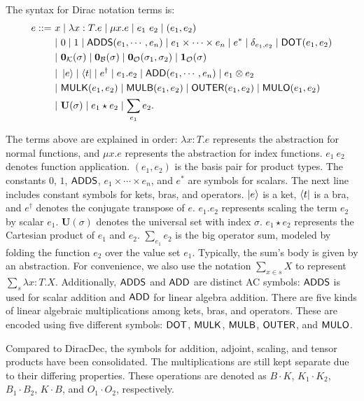 \begin{definition}
    The syntax for Dirac notation terms is:
    \begin{align*}
        e ::=\ & x \mid \lambda x : T.e \mid \mu x.e \mid e_1\ e_2 \mid (e_1, e_2) \\
        & |\ 0 \mid 1 \mid \mathsf{ADDS}(e_1, \cdots, e_n) \mid e_1 \times \cdots \times e_n \mid e^* \mid \delta_{e_1, e_2} \mid \mathsf{DOT}(e_1, e_2) \\
        & |\ \mathbf{0}_\mathcal{K}(\sigma) \mid \mathbf{0}_\mathcal{B}(\sigma) \mid \mathbf{0}_\mathcal{O}(\sigma_1, \sigma_2) \mid \mathbf{1}_\mathcal{O}(\sigma) \\
        & |\ \ket{e} \mid \bra{t} \mid e^\dagger \mid e_1.e_2 \mid \mathsf{ADD}(e_1, \cdots, e_n) \mid e_1 \otimes e_2 \\
        & |\ \mathsf{MULK}(e_1, e_2) \mid \mathsf{MULB}(e_1, e_2) \mid \mathsf{OUTER}(e_1, e_2) \mid \mathsf{MULO}(e_1, e_2) \\
        & |\ \mathbf{U}(\sigma) \mid e_1 \star e_2 \mid \sum_{e_1} e_2.
    \end{align*}
\end{definition}
The terms above are explained in order:
\( \lambda x : T.e \) represents the abstraction for normal functions, and \( \mu x.e \) represents the abstraction for index functions.
\( e_1\ e_2 \) denotes function application.
\( (e_1, e_2) \) is the basis pair for product types.
The constants \( 0 \), \( 1 \), \( \mathsf{ADDS} \), \( e_1 \times \cdots \times e_n \), and \( e^* \) are symbols for scalars.
The next line includes constant symbols for kets, bras, and operators.
\( \ket{e} \) is a ket, \( \bra{t} \) is a bra, and \( e^\dagger \) denotes the conjugate transpose of \( e \).
\( e_1.e_2 \) represents scaling the term \( e_2 \) by scalar \( e_1 \).
\( \mathbf{U}(\sigma) \) denotes the universal set with index \( \sigma \).
\( e_1 \star e_2 \) represents the Cartesian product of \( e_1 \) and \( e_2 \).
\( \sum_{e_1} e_2 \) is the big operator sum, modeled by folding the function \( e_2 \) over the value set \( e_1 \). Typically, the sum's body is given by an abstraction. For convenience, we also use the notation \( \sum_{x \in s} X \) to represent \( \sum_{s} \lambda x : T . X \).
Additionally, \( \mathsf{ADDS} \) and \( \mathsf{ADD} \) are distinct AC symbols: \( \mathsf{ADDS} \) is used for scalar addition and \( \mathsf{ADD} \) for linear algebra addition.
There are five kinds of linear algebraic multiplications among kets, bras, and operators. These are encoded using five different symbols: \( \mathsf{DOT} \), \( \mathsf{MULK} \), \( \mathsf{MULB} \), \( \mathsf{OUTER} \), and \( \mathsf{MULO} \).

Compared to DiracDec, the symbols for addition, adjoint, scaling, and tensor products have been consolidated.
The multiplications are still kept separate due to their differing properties.
These operations are denoted as \( B \cdot K \), \( K_1 \cdot K_2 \), \( B_1 \cdot B_2 \), \( K \cdot B \), and \( O_1 \cdot O_2 \), respectively.




